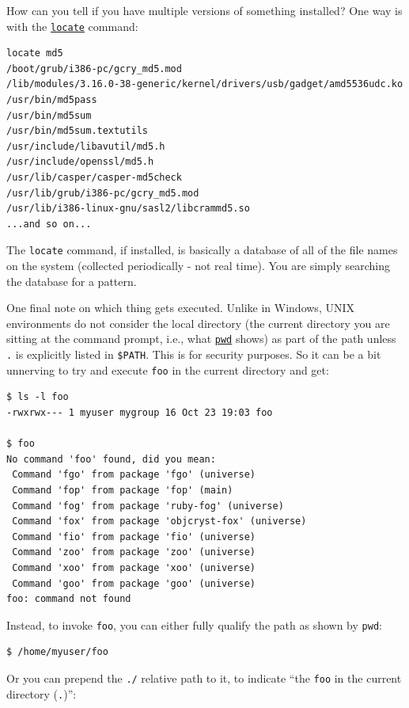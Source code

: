 \documentclass[10pt,]{book}
\numberwithin{figure}{chapter}
\begin{document}
How can you tell if you have multiple versions of something installed?
One way is with the
\href{http://linux.die.net/man/1/locate}{\texttt{locate}} command:

\begin{verbatim}
locate md5
/boot/grub/i386-pc/gcry_md5.mod
/lib/modules/3.16.0-38-generic/kernel/drivers/usb/gadget/amd5536udc.ko
/usr/bin/md5pass
/usr/bin/md5sum
/usr/bin/md5sum.textutils
/usr/include/libavutil/md5.h
/usr/include/openssl/md5.h
/usr/lib/casper/casper-md5check
/usr/lib/grub/i386-pc/gcry_md5.mod
/usr/lib/i386-linux-gnu/sasl2/libcrammd5.so
...and so on...
\end{verbatim}

The \texttt{locate} command, if installed, is basically a database of
all of the file names on the system (collected periodically - not real
time). You are simply searching the database for a pattern.

One final note on which thing gets executed. Unlike in Windows, UNIX
environments do not consider the local directory (the current directory
you are sitting at the command prompt, i.e., what
\href{http://linux.die.net/man/1/pwd}{\texttt{pwd}} shows) as part of
the path unless \texttt{.} is explicitly listed in \texttt{\$PATH}. This
is for security purposes. So it can be a bit unnerving to try and
execute \texttt{foo} in the current directory and get:

\begin{verbatim}
$ ls -l foo
-rwxrwx--- 1 myuser mygroup 16 Oct 23 19:03 foo

$ foo
No command 'foo' found, did you mean:
 Command 'fgo' from package 'fgo' (universe)
 Command 'fop' from package 'fop' (main)
 Command 'fog' from package 'ruby-fog' (universe)
 Command 'fox' from package 'objcryst-fox' (universe)
 Command 'fio' from package 'fio' (universe)
 Command 'zoo' from package 'zoo' (universe)
 Command 'xoo' from package 'xoo' (universe)
 Command 'goo' from package 'goo' (universe)
foo: command not found
\end{verbatim}

Instead, to invoke \texttt{foo}, you can either fully qualify the path
as shown by \texttt{pwd}:

\begin{verbatim}
$ /home/myuser/foo
\end{verbatim}

Or you can prepend the \texttt{./} relative path to it, to indicate
``the \texttt{foo} in the current directory (\texttt{.})'':
\end{document}
